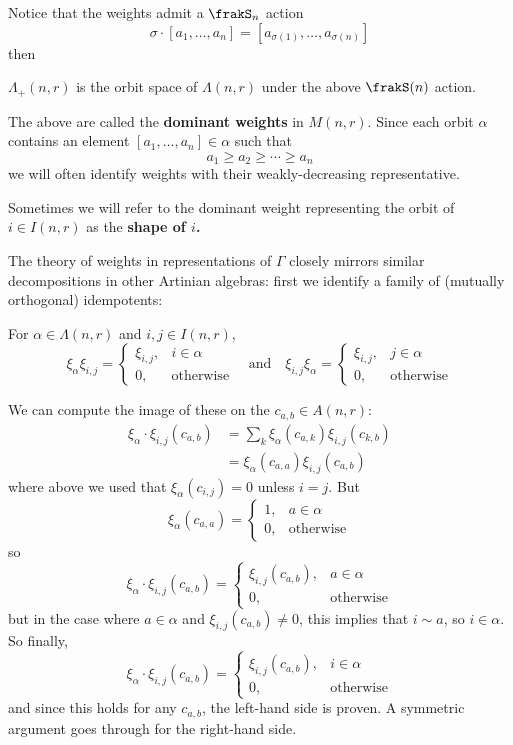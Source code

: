 \documentclass[12pt]{article}
\begin{document}
Notice that the weights admit a $\frakS_n$ action 
\[\sigma\cdot [a_1,\dots,a_n]=[a_{\sigma(1)},\dots,a_{\sigma(n)}]\]
then 
\begin{defn}
	$\Lambda_+(n,r)$ is the orbit space of $\Lambda(n,r)$ under the above $\frakS(n)$ action.
\end{defn}
\begin{rmk}
	The above are called the \textbf{dominant weights} in $M(n,r)$. Since each orbit $\alpha$ contains an element $[a_1,\dots,a_n]\in\alpha$ such that 
	\[a_1\ge a_2\ge\cdots\ge a_n\]
	we will often identify weights with their weakly-decreasing representative.

	Sometimes we will refer to the dominant weight representing the orbit of $i\in I(n,r)$ as the \textbf{shape of $i$.}
\end{rmk}

The theory of weights in representations of $\Gamma$ closely mirrors similar decompositions in other 
Artinian algebras: first we identify a family of (mutually orthogonal) idempotents:
\begin{lem}
	For $\alpha\in\Lambda(n,r)$ and $i,j\in I(n,r)$,
	\[\xi_\alpha\xi_{i,j}=\begin{cases}
		\xi_{i,j}, & i\in\alpha\\
		0, &\text{otherwise}
	\end{cases}\quad\text{and}\quad\xi_{i,j}\xi_\alpha=\begin{cases}
		\xi_{i,j}, & j\in\alpha\\
		0, &\text{otherwise}
	\end{cases}\]
\end{lem}
\begin{prf}
	We can compute the image of these on the $c_{a,b}\in A(n,r)$:
	\begin{align*}
		\xi_\alpha\cdot \xi_{i,j}(c_{a,b})&=\sum_k \xi_\alpha(c_{a,k})\xi_{i,j}(c_{k,b})\\
		&= \xi_\alpha(c_{a,a})\xi_{i,j}(c_{a,b})
	\end{align*}
	where above we used that $\xi_{\alpha}(c_{i,j})=0$ unless $i=j$. But 
	\[\xi_\alpha(c_{a,a})=\begin{cases}
		1, & a\in\alpha\\ 0, & \text{otherwise}
	\end{cases}\]
	so 
	\[\xi_\alpha\cdot \xi_{i,j}(c_{a,b})=\begin{cases}
		\xi_{i,j}(c_{a,b}),& a\in\alpha\\ 0,& \text{otherwise}
	\end{cases}\]
	but in the case where $a\in\alpha$ and $\xi_{i,j}(c_{a,b})\ne 0$, this implies that $i\sim a$, so $i\in \alpha$. So finally,
	\[\xi_\alpha\cdot \xi_{i,j}(c_{a,b})=\begin{cases}
		\xi_{i,j}(c_{a,b}),& i\in\alpha\\ 0,& \text{otherwise}
	\end{cases}\]
	and since this holds for any $c_{a,b}$, the left-hand side is proven. A symmetric argument goes through for the right-hand side.
\end{prf}
\end{document}
